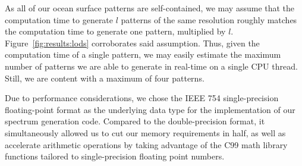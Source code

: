 %
As all of our ocean surface patterns are self-contained, we may assume
that the computation time to generate $l$ patterns of the same resolution
roughly matches the computation time to generate one pattern, multiplied by
$l$. Figure~\ref{fig:results:lods} corroborates said assumption.
Thus, given the computation time of a single pattern, we may easily estimate
the maximum number of patterns we are able to generate in real-time on a
single CPU thread. Still, we are content with a maximum of four patterns.

Due to performance considerations, we chose the IEEE 754 single-precision
floating-point format \citep{IEEE:754} as the underlying data type for
the implementation of our spectrum generation code. Compared to the
double-precision format, it simultaneously allowed us to cut our memory
requirements in half, as well as accelerate arithmetic operations by taking
advantage of the C99 \citep{C99} math library functions tailored to
single-precision floating point numbers.
%
%


